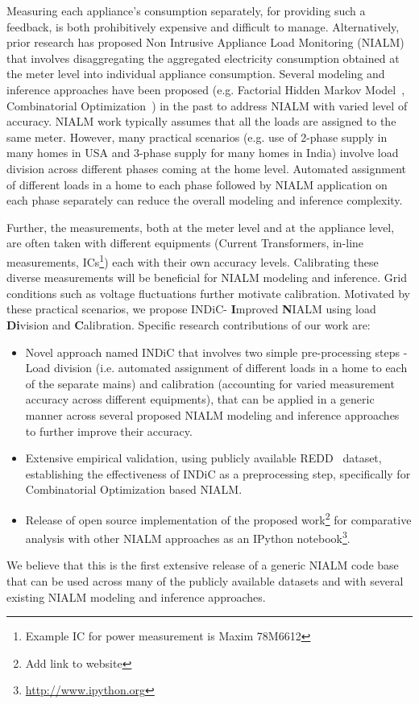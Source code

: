 \documentclass[conference]{IEEEtran}
\newcommand{\indic}{INDiC}
\begin{document}
\noindent Measuring each appliance's consumption separately, for providing such a feedback, is both prohibitively expensive and difficult to manage. Alternatively, prior research has proposed Non Intrusive Appliance Load Monitoring (NIALM) that involves disaggregating the aggregated electricity consumption obtained at the meter level into individual appliance consumption. Several modeling and inference approaches have been proposed (e.g. Factorial Hidden Markov Model~\cite{Ghahramani_97a}, Combinatorial Optimization~\cite{hart}) in the past to address NIALM with varied level of accuracy. NIALM work typically assumes that all the loads are assigned to the same meter. However, many practical scenarios (e.g. use of 2-phase supply in many homes in USA and 3-phase supply for many homes in India) involve load division across different phases coming at the home level. Automated assignment of different loads in a home to each phase followed by NIALM application on each phase separately can reduce the overall modeling and inference complexity. 

\noindent Further, the measurements, both at the meter level and at the appliance level, are often taken with different equipments (Current Transformers, in-line measurements, ICs\footnote{Example IC for power measurement is Maxim 78M6612}) each with their own accuracy levels. Calibrating these diverse measurements will be beneficial for NIALM modeling and inference. Grid conditions such as voltage fluctuations further motivate calibration. Motivated by these practical scenarios, we propose \indic - \textbf{I}mproved \textbf{N}IALM using load \textbf{Di}vision and \textbf{C}alibration. Specific research contributions of our work are:
\begin{itemize}
\item Novel approach named INDiC that involves two simple pre-processing steps - Load division (i.e. automated assignment of different loads in a home to each of the separate mains) and calibration (accounting for varied measurement accuracy across different equipments), that can be applied in a generic manner across several proposed NIALM modeling and inference approaches to further improve their accuracy. 
\item Extensive empirical validation, using publicly available REDD~\cite{redd} dataset, establishing the effectiveness of INDiC as a preprocessing step, specifically for Combinatorial Optimization based NIALM. 
\item Release of open source implementation of the proposed work\footnote{Add link to website} for comparative analysis with other NIALM approaches as an IPython notebook\footnote{\url{http://www.ipython.org}}. 
\end{itemize}
\noindent We believe that this is the first extensive release of a generic NIALM code base that can be used across many of the publicly available datasets and with several existing NIALM modeling and inference approaches.
\end{document}
